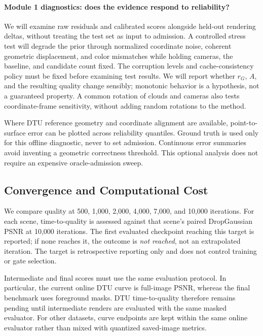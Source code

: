 \documentclass{article}
\begin{document}
\paragraph{Module 1 diagnostics: does the evidence respond to reliability?}
We will examine raw residuals and calibrated scores alongside held-out rendering deltas, without treating the test set as input to admission. A controlled stress test will degrade the prior through normalized coordinate noise, coherent geometric displacement, and color mismatches while holding cameras, the baseline, and candidate count fixed. The corruption levels and cache-consistency policy must be fixed before examining test results. We will report whether $r_G$, $A$, and the resulting quality change sensibly; monotonic behavior is a hypothesis, not a guaranteed property. A common rotation of clouds and cameras also tests coordinate-frame sensitivity, without adding random rotations to the method.

Where DTU reference geometry and coordinate alignment are available, point-to-surface error can be plotted across reliability quantiles. Ground truth is used only for this offline diagnostic, never to set admission. Continuous error summaries avoid inventing a geometric correctness threshold. This optional analysis does not require an expensive oracle-admission sweep.

\subsection{Convergence and Computational Cost}
\label{sec:efficiency}

We compare quality at 500, 1,000, 2,000, 4,000, 7,000, and 10,000 iterations. For each scene, time-to-quality is assessed against that scene's paired DropGaussian PSNR at 10,000 iterations. The first evaluated checkpoint reaching this target is reported; if none reaches it, the outcome is \emph{not reached}, not an extrapolated iteration. The target is retrospective reporting only and does not control training or gate selection.

Intermediate and final scores must use the same evaluation protocol. In particular, the current online DTU curve is full-image PSNR, whereas the final benchmark uses foreground masks. DTU time-to-quality therefore remains pending until intermediate renders are evaluated with the same masked evaluator. For other datasets, curve endpoints are kept within the same online evaluator rather than mixed with quantized saved-image metrics.
\end{document}
